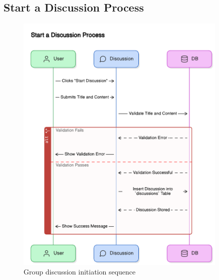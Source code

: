 \subsection{Start a Discussion Process}
\begin{figure}[H]
    \centering
    \includegraphics[width=0.9\textwidth]{images/sequence_diagrams/start_a_discussion_process.png}
    \caption{Group discussion initiation sequence}
    \label{fig:start_discussion}
\end{figure}

